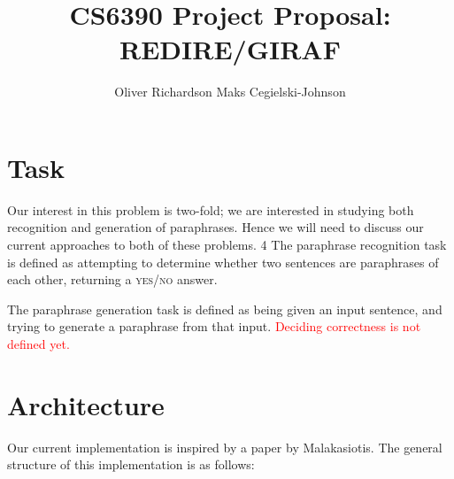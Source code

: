 \documentclass[11pt, reqno]{amsart}
\begin{document}
	\title{\LARGE CS6390 Project Proposal: REDIRE/GIRAF}
	\author{\textsc Oliver Richardson \hspace{2em} Maks Cegielski-Johnson }
	\maketitle 
	
	\vspace{-2em}
	
	\section{Task}

	Our interest in this problem is two-fold; we are interested in studying both recognition and generation of paraphrases. Hence we will need to discuss our current approaches to both of these problems. 
4	
	The paraphrase recognition task is defined as attempting to determine whether two sentences are paraphrases of each other, returning a \textsc{yes/no} answer.
	
	The paraphrase generation task is defined as being given an input sentence, and trying to generate a paraphrase from that input. \textcolor{red}{Deciding correctness is not defined yet.}
	

	
	\section{Architecture}
	Our current implementation is inspired by a paper by Malakasiotis\cite{malakasiotis2009paraphrase}. The general structure of this implementation is as follows:
	
\end{document}
